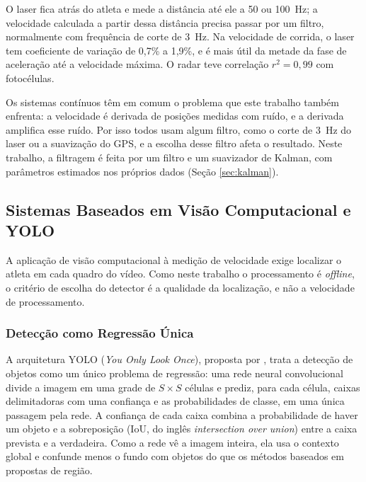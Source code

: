 \documentclass[
    12pt,               %
    openright,          %
    twoside,            %
    a4paper,            %
    chapter=TITLE,      %
    english,            %
    brazil              %
    ]{abntex2}
\begin{document}
O laser fica atrás do atleta e mede a distância até ele a 50 ou 100~Hz; a velocidade calculada a partir dessa distância precisa passar por um filtro, normalmente com frequência de corte de 3~Hz. Na velocidade de corrida, o laser tem coeficiente de variação de 0,7\% a 1,9\%, e é mais útil da metade da fase de aceleração até a velocidade máxima. O radar teve correlação $r^2 = 0{,}99$ com fotocélulas.

Os sistemas contínuos têm em comum o problema que este trabalho também enfrenta: a velocidade é derivada de posições medidas com ruído, e a derivada amplifica esse ruído. Por isso todos usam algum filtro, como o corte de 3~Hz do laser ou a suavização do GPS, e a escolha desse filtro afeta o resultado. Neste trabalho, a filtragem é feita por um filtro e um suavizador de Kalman, com parâmetros estimados nos próprios dados (Seção \ref{sec:kalman}).

\subsection{Sistemas Baseados em Visão Computacional e YOLO}
\label{sec:visao}

A aplicação de visão computacional à medição de velocidade exige localizar o atleta em cada quadro do vídeo. Como neste trabalho o processamento é \textit{offline}, o critério de escolha do detector é a qualidade da localização, e não a velocidade de processamento.

\subsubsection{Detecção como Regressão Única}
A arquitetura YOLO (\textit{You Only Look Once}), proposta por , trata a detecção de objetos como um único problema de regressão: uma rede neural convolucional divide a imagem em uma grade de $S \times S$ células e prediz, para cada célula, caixas delimitadoras com uma confiança e as probabilidades de classe, em uma única passagem pela rede. A confiança de cada caixa combina a probabilidade de haver um objeto e a sobreposição (IoU, do inglês \textit{intersection over union}) entre a caixa prevista e a verdadeira. Como a rede vê a imagem inteira, ela usa o contexto global e confunde menos o fundo com objetos do que os métodos baseados em propostas de região.

\end{document}
